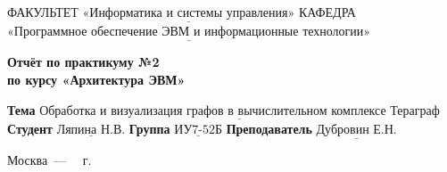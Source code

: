 \begin{titlepage}
	
	\noindent ФАКУЛЬТЕТ $\underline{\text{«Информатика и системы управления»}}$ \newline\newline
	\noindent КАФЕДРА $\underline{\text{«Программное обеспечение ЭВМ и информационные технологии»}}$\newline\newline\newline\newline\newline\newline\newline
	
	\vspace{\baselineskip}

	\begin{center}
		\Large\textbf{Отчёт по практикуму №2} \\
		\Large\textbf{по курсу «Архитектура ЭВМ»} \\
	\end{center}
	\vspace{2.5cm}
	
	\noindent\textbf{Тема} $\underline{\text{Обработка и визуализация графов в вычислительном комплексе Тераграф}}$\newline\newline
	\noindent\textbf{Студент} $\underline{\text{Ляпина Н.В.}}$\newline\newline
	\noindent\textbf{Группа} $\underline{\text{ИУ7-52Б}}$\newline\newline
	\noindent\textbf{Преподаватель} $\underline{\text{Дубровин Е.Н.}}$\newline
	
	\begin{center}
		\vfill
		Москва~---~\the\year
		~г.
	\end{center}
	\restoregeometry
\end{titlepage}